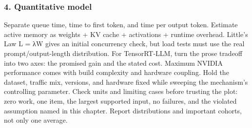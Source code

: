 \subsubsection*{4. Quantitative model}
Separate queue time, time to first token, and time per output token. Estimate active memory as weights + KV cache + activations + runtime overhead. Little's Law L = λW gives an initial concurrency check, but load tests must use the real prompt/output-length distribution.
For TensorRT-LLM, turn the prose tradeoff into two axes: the promised gain and the stated cost. Maximum NVIDIA performance comes with build complexity and hardware coupling. Hold the dataset, traffic mix, versions, and hardware fixed while sweeping the mechanism's controlling parameter.
Check units and limiting cases before trusting the plot: zero work, one item, the largest supported input, no failures, and the violated assumption named in this chapter. Report distributions and important cohorts, not only one average.
